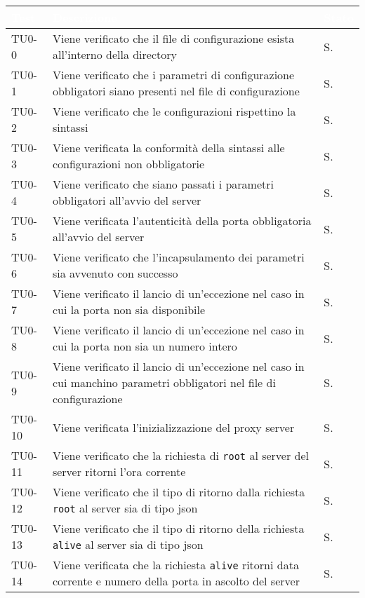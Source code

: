 \begin{longtable}{|C{.15\textwidth}|m{.66\textwidth}|C{.10\textwidth}|}
\hline
{}\textbf{\textcolor{white}{Test}}  & \textbf{\textcolor{white}{Descrizione}} & \textbf{\textcolor{white}{Stato}}\\
\hline \hline
\endhead

TU0-0 & Viene verificato che il file di configurazione esista all'interno della directory & S.\\
\hline 
{} TU0-1 & Viene verificato che i parametri di configurazione obbligatori siano presenti nel file di configurazione & S. \\ 
\hline
TU0-2 & Viene verificato che le configurazioni rispettino la sintassi & S. \\ 
\hline
{} TU0-3 & Viene verificata la conformità della sintassi alle configurazioni non obbligatorie & S. \\ 
\hline 
TU0-4 & Viene verificato che siano passati i parametri obbligatori all'avvio del server & S. \\ 
\hline
{} TU0-5 & Viene verificata l'autenticità della porta obbligatoria all'avvio del server & S. \\ 
\hline
TU0-6 & Viene verificato  che l'incapsulamento dei parametri sia avvenuto con successo & S. \\
\hline 
{} TU0-7 & Viene verificato il lancio di un'eccezione nel caso in cui la porta non sia disponibile & S. \\ 
\hline 
TU0-8 & Viene verificato il lancio di un'eccezione nel caso in cui la porta non sia un numero intero & S. \\
\hline
{}  TU0-9 & Viene verificato il lancio di un'eccezione nel caso in cui manchino parametri obbligatori nel file di configurazione & S. \\ 
\hline
TU0-10 & Viene verificata l'inizializzazione del proxy server & S. \\ 
\hline 
{} TU0-11 & Viene verificato che la richiesta di \texttt{root} al server del server ritorni l'ora corrente & S. \\ 
\hline
TU0-12 & Viene verificato che il tipo di ritorno dalla richiesta \texttt{root} al server sia di tipo json & S. \\ 
\hline 
{}TU0-13 & Viene verificato che il tipo di ritorno della richiesta \texttt{alive} al server sia di tipo json & S. \\ 
\hline
TU0-14 & Viene verificata che la richiesta \texttt{alive} ritorni data corrente e numero della porta in ascolto del server & S. \\ 

\end{longtable}
